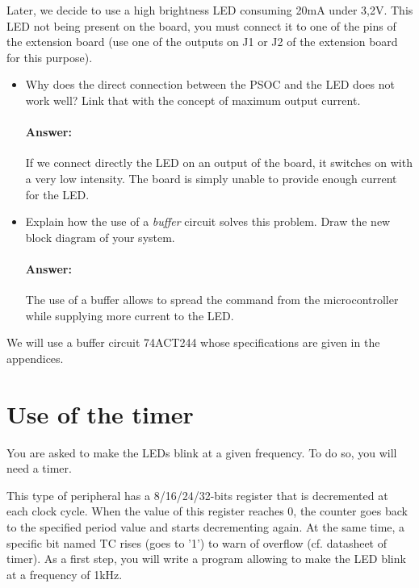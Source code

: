 \documentclass[11pt,a4paper]{article}
\theoremstyle{definition}%
\newcommand{\reponse}[1]{%
	\ifthenelse {\boolean{corrige}} {\paragraph{Answer:} \color{darkblue}   #1\color{black}} {}
 }
\begin{document}
Later, we decide to use a high brightness LED consuming 20mA under 3,2V.
This LED not being present on the board, you must connect it to one of the pins of the extension board (use one of the outputs on J1 or J2 of the extension board for this purpose).


\begin{itemize}
	\item Why does the direct connection between the PSOC and the LED does not work well?
	Link that with the concept of maximum output current.
	\reponse{
        If we connect directly the LED on an output of the board, it switches on with a very low intensity. The board is simply unable to provide enough current for the LED.
	}
	\item Explain how the use of a \textit{buffer} circuit solves this problem.
	Draw the new block diagram of your system.
	\reponse{
		The use of a buffer allows to spread the command from the microcontroller while supplying more current to the LED.
	}
\end{itemize}
We will use a buffer circuit 74ACT244 whose specifications are given in the appendices.





\section{Use of the timer}
You are asked to make the LEDs blink at a given frequency. To do so, you will need a timer. 

This type of peripheral has a 8/16/24/32-bits register that is decremented at each clock cycle. When the value of this register reaches 0, the counter goes back to the specified period value and starts decrementing again. At the same time, a specific bit named TC rises (goes to '1') to warn of overflow (cf. datasheet of timer).
As a first step, you will write a program allowing to make the LED blink at a frequency of 1kHz.
\end{document}
